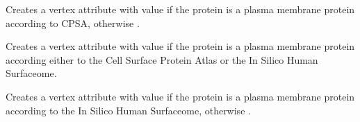 \documentclass[letterpaper,10pt,english]{sphinxmanual}
\begin{document}
\begin{fulllineitems}
\begin{fulllineitems}
\end{fulllineitems}


\begin{fulllineitems}
\label{\detokenize{reference:pypath.main.PyPath.set_plasma_membrane_proteins_cspa}}
Creates a vertex attribute  with value  if
the protein is a plasma membrane protein according to CPSA,
otherwise .

\end{fulllineitems}


\begin{fulllineitems}
\label{\detokenize{reference:pypath.main.PyPath.set_plasma_membrane_proteins_cspa_surfaceome}}
Creates a vertex attribute  with value  if
the protein is a plasma membrane protein according either to the
Cell Surface Protein Atlas or the In Silico Human Surfaceome.

\end{fulllineitems}


\begin{fulllineitems}
\label{\detokenize{reference:pypath.main.PyPath.set_plasma_membrane_proteins_surfaceome}}
Creates a vertex attribute  with value  if
the protein is a plasma membrane protein according to the In Silico
Human Surfaceome, otherwise .

\end{fulllineitems}


\end{fulllineitems}
\end{document}
